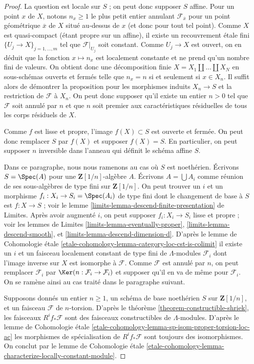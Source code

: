 \begin{proof}
La question est locale sur $S$ ; on peut donc supposer $S$ affine.
Pour un point $x$ de $X$, notons $n_x \geq 1$
le plus petit entier annulant $\mathcal{F}_{\overline{x}}$
pour un point géométrique $\overline{x}$ de $X$
situé au-dessus de $x$ (et donc pour tout tel point). Comme $X$ est quasi-compact (étant propre sur un affine),
il existe un recouvrement étale fini $\{U_j \to X\}_{j = 1, \ldots, m}$
tel que $\mathcal{F}|_{U_j}$ soit constant. Comme $U_j \to X$
est ouvert, on en déduit que la fonction $x \mapsto n_x$ est localement
constante et ne prend qu'un nombre fini de valeurs. On obtient donc
une décomposition finie $X = X_1 \amalg \ldots \amalg X_N$
en sous-schémas ouverts et fermés telle que $n_x = n$ si et seulement si $x \in X_n$.
Il suffit alors de démontrer la proposition pour les morphismes induits
$X_n \to S$ et la restriction de $\mathcal{F}$ à $X_n$.
On peut donc supposer qu'il existe un entier $n > 0$ tel
que $\mathcal{F}$ soit annulé par $n$ et que $n$
soit premier aux caractéristiques résiduelles de tous les corps résiduels de $X$.

\medskip\noindent
Comme $f$ est lisse et propre, l'image $f(X) \subset S$ est ouverte et fermée.
On peut donc remplacer $S$ par $f(X)$ et supposer $f(X) = S$. En particulier,
on peut supposer $n$ inversible dans l'anneau qui définit le
schéma affine $S$.

\medskip\noindent
Dans ce paragraphe, nous nous ramenons au cas où $S$ est noethérien.
Écrivons $S = \Spec(A)$ pour une $\mathbf{Z}[1/n]$-algèbre $A$.
Écrivons $A = \bigcup A_i$ comme réunion de ses sous-algèbres de type fini
sur $\mathbf{Z}[1/n]$. On peut trouver un $i$ et un morphisme
$f_i : X_i \to S_i = \Spec(A_i)$ de type
fini dont le changement de base à $S$ est $f : X \to S$ ; voir le
lemme \ref{limits-lemma-descend-finite-presentation} de Limites.
Après avoir augmenté $i$, on peut supposer $f_i : X_i \to S_i$
lisse et propre ; voir les lemmes de Limites
\ref{limits-lemma-eventually-proper},
\ref{limits-lemma-descend-smooth}, et
\ref{limits-lemma-descend-dimension-d}.
D'après le lemme de Cohomologie étale
\ref{etale-cohomology-lemma-category-loc-cst-is-colimit}
il existe un $i$ et un faisceau localement constant
de type fini de $\Lambda$-modules
$\mathcal{F}_i$ dont l'image inverse sur $X$ est isomorphe à $\mathcal{F}$.
Comme $\mathcal{F}$ est annulé par $n$, on peut remplacer
$\mathcal{F}_i$ par $\Ker(n : \mathcal{F}_i \to \mathcal{F}_i)$
et supposer qu'il en va de même pour $\mathcal{F}_i$.
On se ramène ainsi au cas traité dans le paragraphe suivant.

\medskip\noindent
Supposons donnés un entier $n \geq 1$, un schéma de base noethérien $S$
sur $\mathbf{Z}[1/n]$, et un faisceau $\mathcal{F}$ de $n$-torsion.
D'après le théorème \ref{theorem-constructible-shriek},
les faisceaux $R^if_*\mathcal{F}$ sont des faisceaux constructibles de $\Lambda$-modules.
D'après le lemme de Cohomologie étale
\ref{etale-cohomology-lemma-sp-isom-proper-torsion-loc-ac}
les morphismes de spécialisation de $R^if_*\mathcal{F}$ sont toujours des isomorphismes.
On conclut par le lemme de Cohomologie étale
\ref{etale-cohomology-lemma-characterize-locally-constant-module}.
\end{proof}
